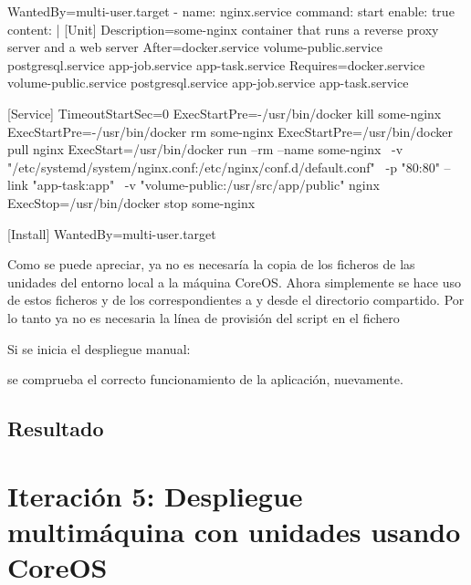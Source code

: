 \begin{codelisting}
\begin{code}
      [Install] 
      WantedBy=multi-user.target
  - name: nginx.service
    command: start
    enable: true
    content: |
      [Unit] 
      Description=some-nginx container that runs a reverse proxy server and a
                  web server
      After=docker.service volume-public.service postgresql.service 
            app-job.service app-task.service
      Requires=docker.service volume-public.service postgresql.service 
               app-job.service app-task.service

      [Service] 
      TimeoutStartSec=0 
      ExecStartPre=-/usr/bin/docker kill some-nginx 
      ExecStartPre=-/usr/bin/docker rm some-nginx
      ExecStartPre=/usr/bin/docker pull nginx 
      ExecStart=/usr/bin/docker run --rm --name some-nginx \
      -v "/etc/systemd/system/nginx.conf:/etc/nginx/conf.d/default.conf" \
      -p "80:80" --link "app-task:app" \
      -v "volume-public:/usr/src/app/public" nginx 
      ExecStop=/usr/bin/docker stop some-nginx

      [Install] 
      WantedBy=multi-user.target
\end{code}
\end{codelisting}

Como se puede apreciar, ya no es necesaría la copia de los ficheros de las unidades del entorno local a la máquina CoreOS. Ahora simplemente se hace uso de estos ficheros y de los correspondientes a  y  desde el directorio compartido. Por lo tanto ya no es necesaria la línea de provisión del script en el fichero 

Si se inicia el despliegue manual:

\begin{code}
$ ./coreos-deploy.sh
\end{code}

se comprueba el correcto funcionamiento de la aplicación, nuevamente.

\subsection{Resultado}

\section{Iteración 5: Despliegue multimáquina con unidades usando CoreOS}

